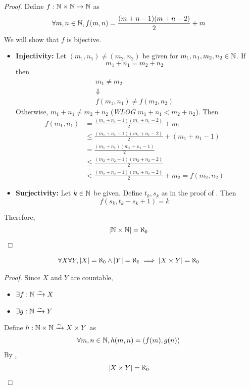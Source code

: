 \begin{proof}
    Define $f: \N \times \N \to \N$ as
    \[
    \forall m, n \in \N, f(m, n) = \frac{(m + n - 1)(m + n - 2)}{2} + m
    \]
    We will show that $f$ is bijective.
    \begin{itemize}
        \item \textbf{Injectivity:} Let $(m_{1}, n_{1}) \neq (m_{2}, n_{2})$ be given for
        $m_{1}, n_{1}, m_{2}, n_{2} \in \N$. If
        \[
        m_{1} + n_{1} = m_{2} + n_{2}
        \]
        then
        \[
        \begin{array}{c}
            m_{1} \neq m_{2} \\
            \Downarrow \\
            f(m_{1}, n_{1}) \neq f(m_{2}, n_{2})
        \end{array}
        \]
        Otherwise, $m_{1} + n_{1} \neq m_{2} + n_{2}$ (\emph{WLOG} $m_{1} + n_{1} < m_{2} + n_{2}$). Then
        \begin{align*}
            f(m_{1}, n_{1}) &= \frac{(m_{1} + n_{1} - 1)(m_{1} + n_{1} - 2)}{2} + m_{1} \\
            &\leq \frac{(m_{1} + n_{1} - 1)(m_{1} + n_{1} - 2)}{2} + (m_{1} + n_{1} - 1) \\
            &= \frac{(m_{1} + n_{1})(m_{1} + n_{1} - 1)}{2} \\
            &\leq \frac{(m_{2} + n_{2} - 1)(m_{2} + n_{2} - 2)}{2} \\
            &< \frac{(m_{2} + n_{2} - 1)(m_{2} + n_{2} - 2)}{2} + m_{2} = f(m_{2}, n_{2})
        \end{align*}
        \item \textbf{Surjectivity:} Let $k \in \N$ be given. Define $t_{k}, s_{k}$ as in the proof of
        . Then
        \[
        f(s_{k}, t_{k} - s_{k} + 1) =  k
        \]
    \end{itemize}
    Therefore,
    \[
    \abs*{\N \times \N} = \aleph_{0}
    \]
\end{proof}

\bigskip

\begin{theorem} \label{an:thm:product-of-two-countable-sets-is-countable}
    \[
    \forall X \forall Y, \abs*{X} = \aleph_{0} \land \abs*{Y} = \aleph_{0} \implies \abs*{X \times Y} = \aleph_{0}
    \]
\end{theorem}

\begin{proof}
    Since $X$ and $Y$ are countable,
    \begin{itemize}
        \item $\exists f: \N \xrightarrow{\sim} X$
        \item $\exists g: \N \xrightarrow{\sim} Y$
    \end{itemize}
    Define $h: \N \times \N \xrightarrow{\sim} X \times Y$ as
    \[
    \forall m, n \in \N, h(m, n) = (f(m), g(n))
    \]
    By ,
    \[
    \abs*{X \times Y} = \aleph_{0}
    \]
\end{proof}

